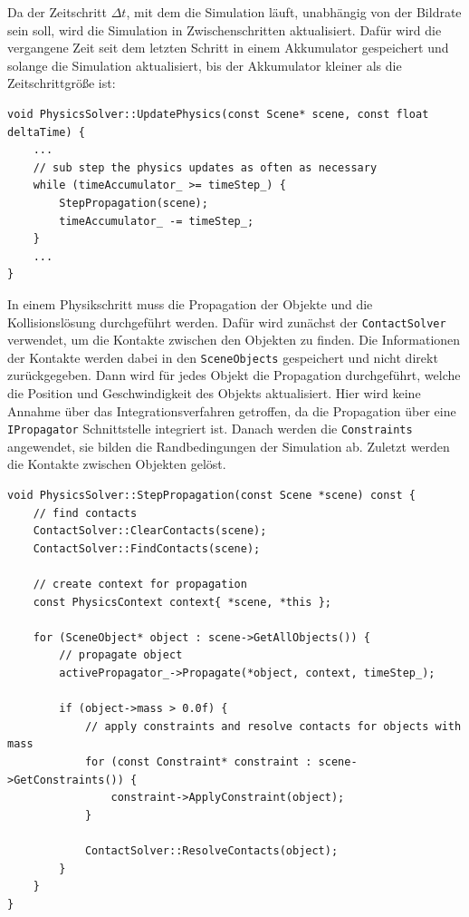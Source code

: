 \documentclass[10pt,twocolumn]{extarticle}
\begin{document}
Da der Zeitschritt $\Delta t$, mit dem die Simulation läuft, unabhängig von der Bildrate sein soll, wird die Simulation in Zwischenschritten aktualisiert. Dafür wird die vergangene Zeit seit dem letzten Schritt in einem Akkumulator gespeichert und solange die Simulation aktualisiert, bis der Akkumulator kleiner als die Zeitschrittgröße ist:

\begin{verbatim}
void PhysicsSolver::UpdatePhysics(const Scene* scene, const float deltaTime) {
    ...
    // sub step the physics updates as often as necessary
    while (timeAccumulator_ >= timeStep_) {
        StepPropagation(scene);
        timeAccumulator_ -= timeStep_;
    }
    ...
}
\end{verbatim}

In einem Physikschritt muss die Propagation der Objekte und die Kollisionslösung durchgeführt werden. Dafür wird zunächst der \texttt{ContactSolver} verwendet, um die Kontakte zwischen den Objekten zu finden. Die Informationen der Kontakte werden dabei in den \texttt{SceneObjects} gespeichert und nicht direkt zurückgegeben. Dann wird für jedes Objekt die Propagation durchgeführt, welche die Position und Geschwindigkeit des Objekts aktualisiert. Hier wird keine Annahme über das Integrationsverfahren getroffen, da die Propagation über eine \texttt{IPropagator} Schnittstelle integriert ist. Danach werden die \texttt{Constraints} angewendet, sie bilden die Randbedingungen der Simulation ab. Zuletzt werden die Kontakte zwischen Objekten gelöst.

\begin{verbatim}
void PhysicsSolver::StepPropagation(const Scene *scene) const {
    // find contacts
    ContactSolver::ClearContacts(scene);
    ContactSolver::FindContacts(scene);

    // create context for propagation
    const PhysicsContext context{ *scene, *this };

    for (SceneObject* object : scene->GetAllObjects()) {
        // propagate object
        activePropagator_->Propagate(*object, context, timeStep_);

        if (object->mass > 0.0f) {
            // apply constraints and resolve contacts for objects with mass
            for (const Constraint* constraint : scene->GetConstraints()) {
                constraint->ApplyConstraint(object);
            }

            ContactSolver::ResolveContacts(object);
        }
    }
}
\end{verbatim}
\end{document}
